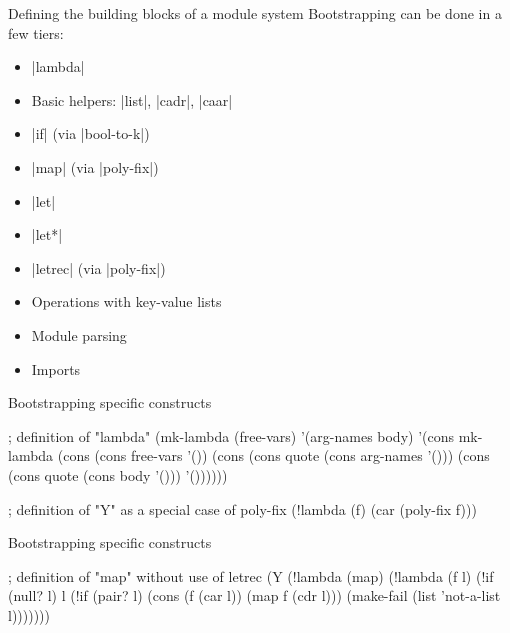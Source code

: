 \begin{frame}[fragile]{Defining the building blocks of a module system}
Bootstrapping can be done in a few tiers:
\begin{itemize}
    \item \linline|lambda|
    \item Basic helpers: \linline|list|, \linline|cadr|, \linline|caar|
    \item \linline|if| (via \linline|bool-to-k|)
    \item \linline|map| (via \linline|poly-fix|)
    \item \linline|let|
    \item \linline|let*|
    \item \linline|letrec| (via \linline|poly-fix|)
    \item Operations with key-value lists
    \item Module parsing
    \item Imports
\end{itemize}
\end{frame}

\begin{frame}[fragile]{Bootstrapping specific constructs}
\begin{listingbox}\begin{ildcode}
; definition of "lambda"
(mk-lambda
  (free-vars)
  '(arg-names body)
  '(cons mk-lambda
    (cons (cons free-vars '())
      (cons (cons quote (cons arg-names '()))
        (cons (cons quote (cons body '()))
          '())))))

; definition of "Y" as a special case of poly-fix
(!lambda (f) (car (poly-fix f)))
\end{ildcode}\end{listingbox}
\end{frame}

\begin{frame}[fragile]{Bootstrapping specific constructs}
\begin{listingbox}\begin{ildcode}
; definition of "map" without use of letrec
(Y (!lambda (map)
  (!lambda (f l)
    (!if (null? l)
      l
      (!if (pair? l)
        (cons
          (f (car l)) (map f (cdr l)))
        (make-fail
          (list 'not-a-list l)))))))
\end{ildcode}\end{listingbox}
\end{frame}

